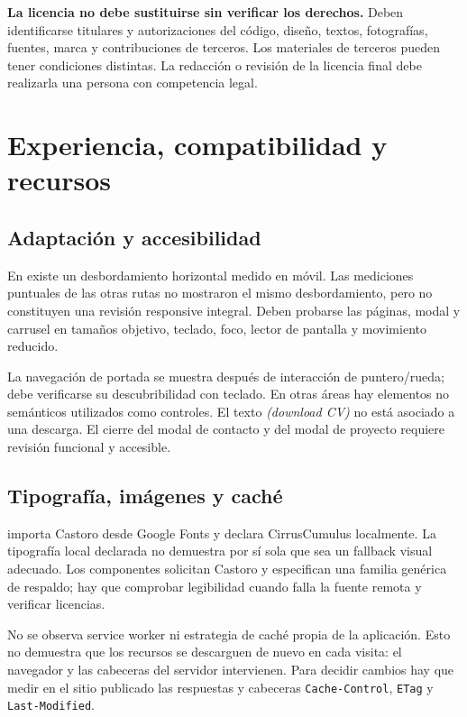 \documentclass[11pt,a4paper]{report}
\begin{document}
\textbf{La licencia no debe sustituirse sin verificar los derechos.} Deben identificarse titulares y autorizaciones del código, diseño, textos, fotografías, fuentes, marca y contribuciones de terceros. Los materiales de terceros pueden tener condiciones distintas. La redacción o revisión de la licencia final debe realizarla una persona con competencia legal.

\chapter{Experiencia, compatibilidad y recursos}

\section{Adaptación y accesibilidad}

En  existe un desbordamiento horizontal medido en móvil. Las mediciones puntuales de las otras rutas no mostraron el mismo desbordamiento, pero no constituyen una revisión responsive integral. Deben probarse las páginas, modal y carrusel en tamaños objetivo, teclado, foco, lector de pantalla y movimiento reducido.

La navegación de portada se muestra después de interacción de puntero/rueda; debe verificarse su descubribilidad con teclado. En otras áreas hay elementos no semánticos utilizados como controles. El texto \textit{(download CV)} no está asociado a una descarga. El cierre del modal de contacto y del modal de proyecto requiere revisión funcional y accesible.

\section{Tipografía, imágenes y caché}

 importa Castoro desde Google Fonts y declara CirrusCumulus localmente. La tipografía local declarada no demuestra por sí sola que sea un fallback visual adecuado. Los componentes solicitan Castoro y especifican una familia genérica de respaldo; hay que comprobar legibilidad cuando falla la fuente remota y verificar licencias.

No se observa service worker ni estrategia de caché propia de la aplicación. Esto no demuestra que los recursos se descarguen de nuevo en cada visita: el navegador y las cabeceras del servidor intervienen. Para decidir cambios hay que medir en el sitio publicado las respuestas y cabeceras \texttt{Cache-Control}, \texttt{ETag} y \texttt{Last-Modified}.
\end{document}
